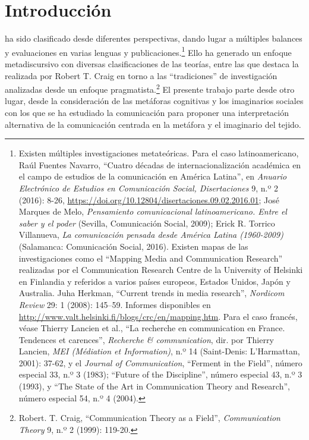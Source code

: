 \documentclass{tufte-handout}
\begin{document}
\vspace*{2em}


\hypertarget{introduccin}{%
\section{Introducción}\label{introduccin}}

  ha sido clasificado desde diferentes
perspectivas, dando lugar a múltiples balances y evaluaciones en varias
lenguas y publicaciones.\footnote{Existen múltiples investigaciones
  metateóricas. Para el caso latinoamericano, Raúl Fuentes Navarro,
  ``Cuatro décadas de internacionalización académica en el campo de
  estudios de la comunicación en América Latina'', en \emph{Anuario
  Electrónico de Estudios en Comunicación Social, Disertaciones} 9, n.º
  2 (2016): 8-26,
  \url{https://doi.org/10.12804/disertaciones.09.02.2016.01}; José
  Marques de Melo, \emph{Pensamiento comunicacional latinoamericano.
  Entre el saber y el poder} (Sevilla, Comunicación Social, 2009); Erick
  R. Torrico Villanueva, \emph{La comunicación pensada desde América
  Latina (1960-2009)} (Salamanca: Comunicación Social, 2016). Existen
  mapas de las investigaciones como el ``Mapping Media and Communication
  Research'' realizadas por el Communication Research Centre de la
  University of Helsinki en Finlandia y referidos a varios países
  europeos, Estados Unidos, Japón y Australia. Juha Herkman, ``Current
  trends in media research'', \emph{Nordicom Review} 29: 1 (2008):
  145--59. Informes disponibles en
  \url{http://www.valt.helsinki.fi/blogs/crc/en/mapping.htm}. Para el
  caso francés, véase Thierry Lancien et al., ``La recherche en
  communication en France. Tendences et carences'', \emph{Recherche \&
  communication}, dir. por Thierry Lancien, \emph{MEI (Médiation et
  Information)}, n.º 14 (Saint-Denis: L'Harmattan, 2001): 37-62, y el
  \emph{Journal of Communication}, ``Ferment in the Field'', número
  especial 33, n.º 3 (1983); ``Future of the Discipline'', número
  especial 43, n.º 3 (1993), y ``The State of the Art in Communication
  Theory and Research'', número especial 54, n.º 4 (2004).} Ello ha
generado un enfoque metadiscursivo con diversas clasificaciones de las
teorías, entre las que destaca la realizada por Robert T. Craig en torno
a las ``tradiciones'' de investigación analizadas desde un enfoque
pragmatista.\footnote{Robert. T. Craig, ``Communication Theory as a
  Field'', \emph{Communication Theory} 9, n.º 2 (1999): 119-20.} El
presente trabajo parte desde otro lugar, desde la consideración de las
metáforas cognitivas y los imaginarios sociales con los que se ha
estudiado la comunicación para proponer una interpretación alternativa
de la comunicación centrada en la metáfora y el imaginario del tejido.
\end{document}
